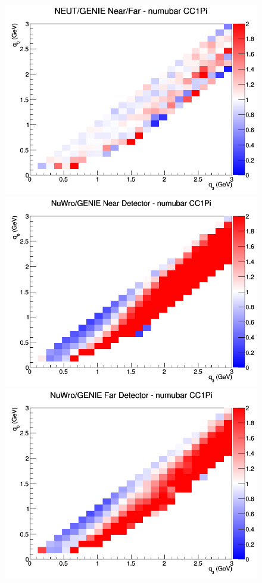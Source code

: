 \documentclass[12pt]{article}
\begin{document}
\begin{figure}[h]
\endminipage
{}
\includegraphics[width=\linewidth]{q0_q3/nominal/ratios/CC1Pi_NEUT_GENIE_numubar_NF_q3_q0.png}
\endminipage
\newline
{}
\includegraphics[width=\linewidth]{q0_q3/nominal/ratios/CC1Pi_NuWro_GENIE_numubar_near_q3_q0.png}
\endminipage
{}
\includegraphics[width=\linewidth]{q0_q3/nominal/ratios/CC1Pi_NuWro_GENIE_numubar_far_q3_q0.png}

\end{figure}
\end{document}
